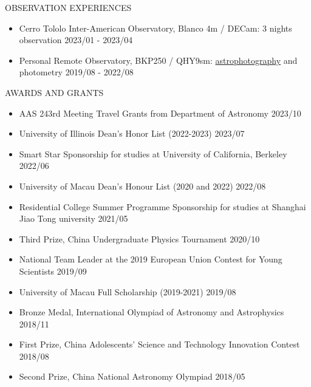 \documentclass[10pt]{article} %
\begin{document}
\begin{section}{OBSERVATION EXPERIENCES}
    
\begin{itemize}[leftmargin=1.5em]
    \item Cerro Tololo Inter-American Observatory, Blanco 4m / DECam: 3 nights observation \hfill 2023/01 - 2023/04
    \item Personal Remote Observatory, BKP250 / QHY9sm: \href{https://yliu.fit/astrophotography/}{astrophotography} and photometry \hfill 2019/08 - 2022/08
\end{itemize}

\end{section}

\begin{section}{AWARDS AND GRANTS}

    \begin{itemize}[leftmargin=1.5em]
        \item AAS 243rd Meeting Travel Grants from Department of Astronomy \hfill 2023/10
        \item University of Illinois Dean's Honor List (2022-2023) \hfill 2023/07
        \item Smart Star Sponsorship for studies at University of California, Berkeley \hfill 2022/06
        \item University of Macau Dean's Honour List (2020 and 2022) \hfill 2022/08
        \item Residential College Summer Programme Sponsorship for studies at Shanghai Jiao Tong university \hfill 2021/05
        \item Third Prize, China Undergraduate Physics Tournament \hfill 2020/10
        \item National Team Leader at the 2019 European Union Contest for Young Scientists \hfill 2019/09
        \item University of Macau Full Scholarship (2019-2021) \hfill 2019/08
        \item Bronze Medal, International Olympiad of Astronomy and Astrophysics \hfill 2018/11
        \item First Prize, China Adolescents' Science and Technology Innovation Contest \hfill 2018/08
        \item Second Prize, China National Astronomy Olympiad \hfill 2018/05
    \end{itemize}
        
\end{section}
\end{document}
